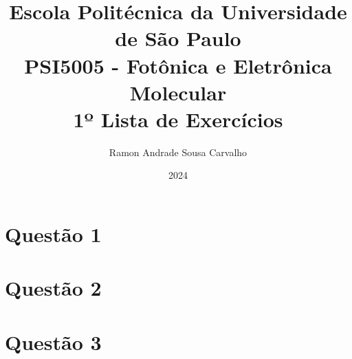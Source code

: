 \documentclass[12pt,twoside]{article}
\title{
{\large Escola Politécnica da Universidade de São Paulo}\\
\vspace*{1.0cm}
{\small PSI5005 - Fotônica e Eletrônica Molecular}\\
{1º Lista de Exercícios}
\vspace*{1.0cm}
}
\author{
	Ramon Andrade Sousa Carvalho
}
\date{2024}
\begin{document}
\maketitle

\section*{Questão 1}


\section*{Questão 2}


\section*{Questão 3}

\end{document}
